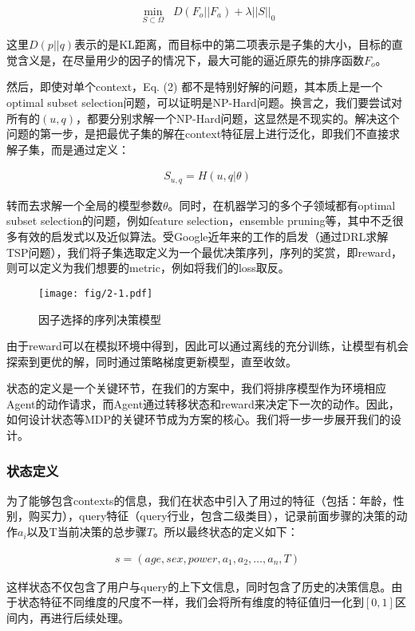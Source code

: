 \begin{align}
\min_{S \subset \Omega} \;\; D(F_o||F_a) + \lambda ||S||_0
\end{align}

这里$D(p||q)$表示的是KL距离，而目标中的第二项表示是子集的大小，目标的直觉含义是，在尽量用少的因子的情况下，最大可能的逼近原先的排序函数$F_o$。

然后，即使对单个context，Eq. (2) 都不是特别好解的问题，其本质上是一个optimal subset selection问题，可以证明是NP-Hard问题。换言之，我们要尝试对所有的$(u,q)$，都要分别求解一个NP-Hard问题，这显然是不现实的。解决这个问题的第一步，是把最优子集的解在context特征层上进行泛化，即我们不直接求解子集，而是通过定义：

\begin{align}
S_{u,q}=H(u,q|\theta)
\end{align}

转而去求解一个全局的模型参数$\theta$。同时，在机器学习的多个子领域都有optimal subset selection的问题，例如feature selection，ensemble pruning等，其中不乏很多有效的启发式以及近似算法。受Google近年来的工作的启发（通过DRL求解TSP问题），我们将子集选取定义为一个最优决策序列，序列的奖赏，即reward，则可以定义为我们想要的metric，例如将我们的loss取反。
\begin{figure}[!h]
\centering
\texttt{[image: fig/2-1.pdf]}
\caption{因子选择的序列决策模型}
\end{figure}
由于reward可以在模拟环境中得到，因此可以通过离线的充分训练，让模型有机会探索到更优的解，同时通过策略梯度更新模型，直至收敛。

状态的定义是一个关键环节，在我们的方案中，我们将排序模型作为环境相应Agent的动作请求，而Agent通过转移状态和reward来决定下一次的动作。因此，如何设计状态等MDP的关键环节成为方案的核心。我们将一步一步展开我们的设计。

\subsubsection{状态定义}
为了能够包含contexts的信息，我们在状态中引入了用过的特征（包括：年龄，性别，购买力），query特征（query行业，包含二级类目），记录前面步骤的决策的动作$a_i$以及T当前决策的总步骤$T$。所以最终状态的定义如下：

\begin{align}
s = (age, sex, power, a_1, a_2,\dots,a_n,T)
\end{align}

这样状态不仅包含了用户与query的上下文信息，同时包含了历史的决策信息。由于状态特征不同维度的尺度不一样，我们会将所有维度的特征值归一化到$[0,1]$区间内，再进行后续处理。

